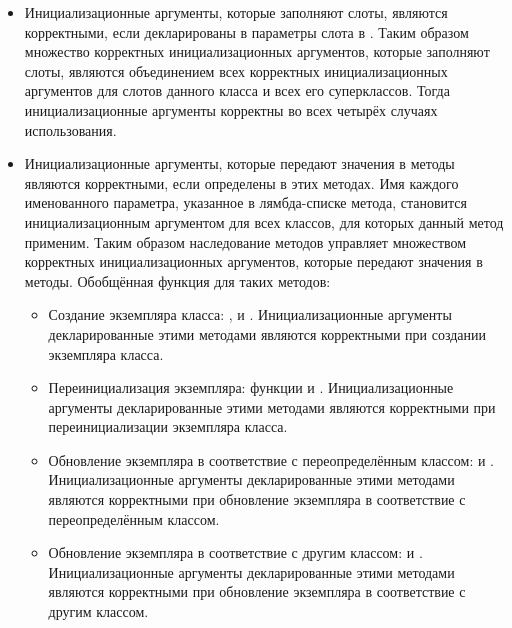 \begin{itemize}

\item Инициализационные аргументы, которые заполняют слоты, являются
  корректными, если декларированы в параметры слота  в
  . Таким образом множество корректных инициализационных
  аргументов, которые заполняют слоты, являются объединением всех корректных
  инициализационных аргументов для слотов данного класса и всех его
  суперклассов. Тогда инициализационные аргументы корректны во всех четырёх
  случаях использования.

\item Инициализационные аргументы, которые передают значения в методы являются
  корректными, если определены в этих методах. Имя каждого именованного
  параметра, указанное в лямбда-списке метода, становится инициализационным
  аргументом для всех классов, для которых данный метод применим. Таким образом
  наследование методов управляет множеством корректных инициализационных
  аргументов, которые передают значения в методы. Обобщённая функция для таких
  методов:

\begin{itemize}

\item Создание экземпляра класса: ,
   и . Инициализационные
  аргументы декларированные этими методами являются корректными при создании
  экземпляра класса.

\item Переинициализация экземпляра: функции  и
  . Инициализационные
  аргументы декларированные этими методами являются корректными при
  переинициализации экземпляра класса.

\item Обновление экземпляра в соответствие с переопределённым классом: 
   и 
  . Инициализационные
  аргументы декларированные этими методами являются корректными при
  обновление экземпляра в соответствие с переопределённым классом.

\item Обновление экземпляра в соответствие с другим классом: 
   и 
  . Инициализационные
  аргументы декларированные этими методами являются корректными при
  обновление экземпляра в соответствие с другим классом.
\end{itemize}
\end{itemize}

